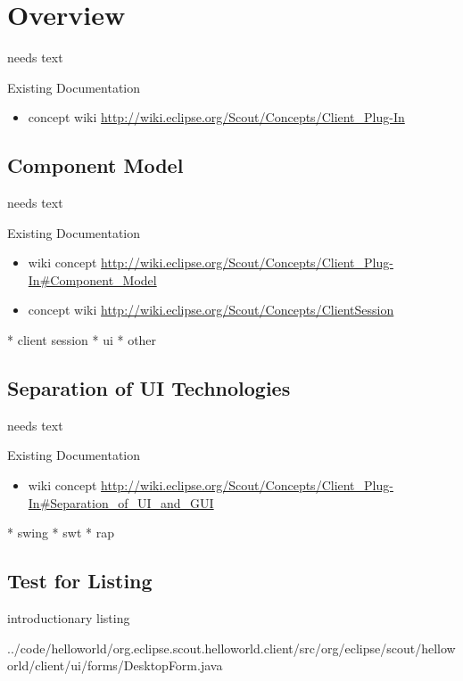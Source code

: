 \documentclass[a4paper,10pt,twoside]{book}
\begin{document}
  \sloppy
\fi


\chapter{Overview}
needs text
  
\noindent Existing Documentation
\begin{itemize}
  \item concept wiki \url{http://wiki.eclipse.org/Scout/Concepts/Client_Plug-In}
\end{itemize}

\section{Component Model}
needs text

\noindent Existing Documentation
\begin{itemize}
  \item wiki concept \url{http://wiki.eclipse.org/Scout/Concepts/Client_Plug-In#Component_Model}
  \item concept wiki \url{http://wiki.eclipse.org/Scout/Concepts/ClientSession}
\end{itemize}

  * client session
  * ui
  * other
  
\section{Separation of UI Technologies}
needs text

\noindent Existing Documentation
\begin{itemize}
  \item wiki concept \url{http://wiki.eclipse.org/Scout/Concepts/Client_Plug-In#Separation_of_UI_and_GUI}
\end{itemize}
  
  * swing
  * swt
  * rap

\section{Test for Listing}

introductionary listing


{../code/helloworld/org.eclipse.scout.helloworld.client/src/org/eclipse/scout/helloworld/client/ui/forms/DesktopForm.java}
\end{document}
